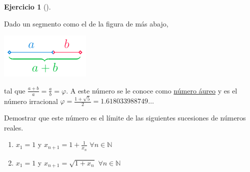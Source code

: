 \documentclass[
  a4paper,
]{scrreport}
\providecommand{\tightlist}{%
  \setlength{\itemsep}{0pt}\setlength{\parskip}{0pt}}\usepackage{longtable,booktabs,array}
\theoremstyle{definition}
\newtheorem{exercise}{Ejercicio}[chapter]
\theoremstyle{remark}
\begin{document}
\leavevmode{}%
\begin{exercise}[]\label{exr-numero-aureo}

Dado un segmento como el de la figura de más abajo,

\includegraphics{././img/sucesiones/numero-aureo.png}

tal que \(\frac{a+b}{a}=\frac{a}{b}=\varphi\). A este número se le
conoce como
\href{https://es.wikipedia.org/wiki/N\%C3\%BAmero_\%C3\%A1ureo}{número
áureo} y es el número irracional
\(\varphi=\frac{1+\sqrt{5}}{2}=1.618033988749\ldots\)

Demostrar que este número es el límite de las siguientes sucesiones de
números reales.

\begin{enumerate}
\def\labelenumi{\alph{enumi}.}
\tightlist
\item
  \(x_1=1\) y \(x_{n+1}=1+\frac{1}{x_n}\) \(\forall n\in \mathbb{N}\)
\item
  \(x_1=1\) y \(x_{n+1}=\sqrt{1+x_n}\) \(\forall n\in\mathbb{N}\)
\end{enumerate}

\end{exercise}
\end{document}
